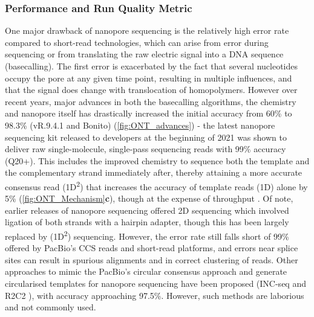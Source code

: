 \vspace{1cm}
\subsubsection{Performance and Run Quality Metric}
One major drawback of nanopore sequencing is the relatively high error rate compared to short-read technologies, which can arise from error during sequencing or from translating the raw electric signal into a DNA sequence (basecalling)\cite{Rang2018}. The first error is exacerbated by the fact that several nucleotides occupy the pore at any given time point, resulting in multiple influences, and that the signal does change with translocation of homopolymers. However over recent years, major advances in both the basecalling algorithms, the chemistry and nanopore itself has drastically increased the initial accuracy from 60\% \cite{Jain2015} to 98.3\% (vR.9.4.1 and Bonito) (\cref{fig:ONT_advances}) - the latest nanopore sequencing kit released to developers at the beginning of 2021 was shown to deliver raw single-molecule, single-pass sequencing reads with 99\% accuracy (Q20+)\cite{OxfordNanoporeTechnologiesplc.2021}. This includes the improved chemistry to sequence both the template and the complementary strand immediately after, thereby attaining a more accurate consensus read (1D\textsuperscript{2}) that increases the accuracy of template reads (1D) alone by 5\%\cite{Rang2018} (\cref{fig:ONT_Mechanism}\textbf{c}), though at the expense of throughput \cite{NanoporeCommunityPosts}. Of note, earlier releases of nanopore sequencing offered 2D sequencing which involved ligation of both strands with a hairpin adapter, though this has been largely replaced by (1D\textsuperscript{2}) sequencing. However, the error rate still falls short of 99\% offered by PacBio's CCS reads and short-read platforms, and errors near splice sites can result in spurious alignments and in correct clustering of reads. Other approaches to mimic the PacBio's circular consensus approach and generate circularised templates for nanopore sequencing have been proposed (INC-seq \cite{Li2016c} and R2C2 \cite{Volden2018}), with accuracy approaching 97.5\%. However, such methods are laborious and not commonly used.  

